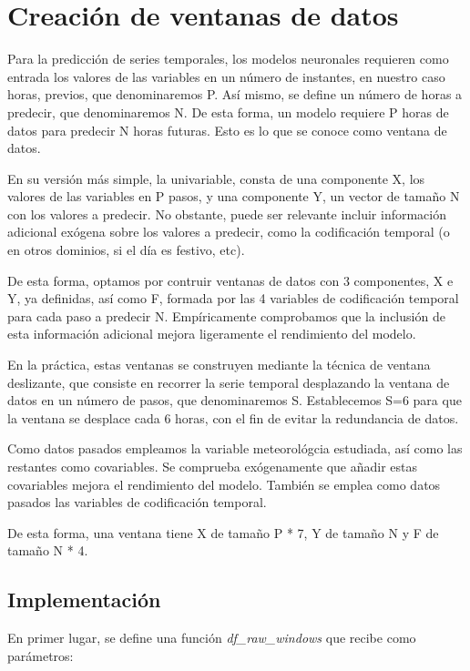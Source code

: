 \section{Creación de ventanas de datos}
Para la predicción de series temporales, los modelos neuronales requieren como entrada los valores de las variables en un número de instantes, en nuestro caso horas,
previos, que denominaremos P. Así mismo, se define un número de horas a predecir, que denominaremos N. 
De esta forma, un modelo requiere P horas de datos para predecir N horas futuras. Esto es lo que se conoce como ventana de datos.

En su versión más simple, la univariable, consta de una componente X, los valores de las variables en P pasos, y una componente Y, un vector
de tamaño N con los valores a predecir. 
No obstante, puede ser relevante incluir información adicional exógena sobre los valores a predecir, como la codificación temporal 
(o en otros dominios, si el día es festivo, etc).

De esta forma, optamos por contruir ventanas de datos con 3 componentes, X e Y, ya definidas, así como F, formada por las 4 variables de codificación temporal 
para cada paso a predecir N. Empíricamente comprobamos que la inclusión de esta información adicional mejora ligeramente el rendimiento del modelo.

En la práctica, estas ventanas se construyen mediante la técnica de ventana deslizante, que consiste en recorrer la serie temporal desplazando 
la ventana de datos en un número de pasos, que denominaremos S. Establecemos S=6 para que la ventana se desplace cada 6 horas, con el fin de evitar 
la redundancia de datos.

Como datos pasados empleamos la variable meteorológcia estudiada, así como las restantes como covariables. Se comprueba exógenamente que 
añadir estas covariables mejora el rendimiento del modelo. También se emplea como datos pasados las variables de codificación temporal. 

De esta forma, una ventana tiene X de tamaño P * 7, Y de tamaño N y F de tamaño N * 4.

\subsection{Implementación}
En primer lugar, se define una función \textit{df\_raw\_windows} que recibe como parámetros:


